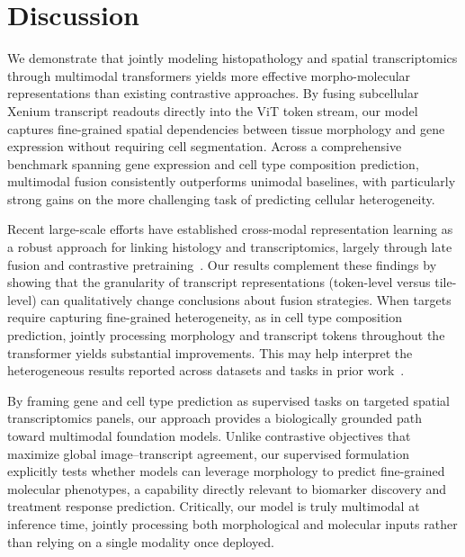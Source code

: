 \section{Discussion}
\label{sec:discussion}
We demonstrate that jointly modeling histopathology and spatial transcriptomics through multimodal transformers yields more effective morpho-molecular representations than existing contrastive approaches. By fusing subcellular Xenium transcript readouts directly into the ViT token stream, our model captures fine-grained spatial dependencies between tissue morphology and gene expression without requiring cell segmentation. Across a comprehensive benchmark spanning gene expression and cell type composition prediction, multimodal fusion consistently outperforms unimodal baselines, with particularly strong gains on the more challenging task of predicting cellular heterogeneity.

Recent large-scale efforts have established cross-modal representation learning as a robust approach for linking histology and transcriptomics, largely through late fusion and contrastive pretraining~\cite{gindra_largescalebenchmarkcrossmodal_2025,chen_visualomicsfoundation_2025}. Our results complement these findings by showing that the granularity of transcript representations (token-level versus tile-level) can qualitatively change conclusions about fusion strategies. When targets require capturing fine-grained heterogeneity, as in cell type composition prediction, jointly processing morphology and transcript tokens throughout the transformer yields substantial improvements. This may help interpret the heterogeneous results reported across datasets and tasks in prior work~\cite{gindra_largescalebenchmarkcrossmodal_2025}.

By framing gene and cell type prediction as supervised tasks on targeted spatial transcriptomics panels, our approach provides a biologically grounded path toward multimodal foundation models. Unlike contrastive objectives that maximize global image--transcript agreement, our supervised formulation explicitly tests whether models can leverage morphology to predict fine-grained molecular phenotypes, a capability directly relevant to biomarker discovery and treatment response prediction. Critically, our model is truly multimodal at inference time, jointly processing both morphological and molecular inputs rather than relying on a single modality once deployed.

